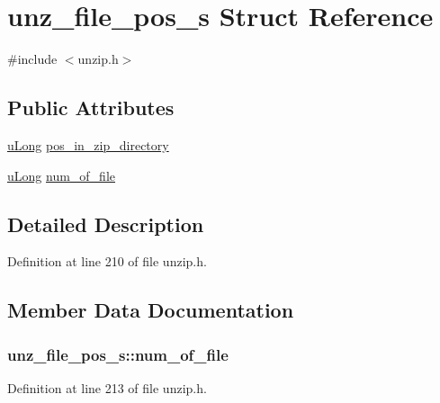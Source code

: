 \hypertarget{structunz__file__pos__s}{\section{unz\-\_\-file\-\_\-pos\-\_\-s Struct Reference}
\label{structunz__file__pos__s}
}


{\ttfamily \#include $<$unzip.\-h$>$}

\subsection*{Public Attributes}
\begin{DoxyCompactItemize}
\item 
\hyperlink{zconf_8h_a154b3b80120c903a368fec5f11f3007a}{u\-Long} \hyperlink{structunz__file__pos__s_a87d193346d3825363f899f574a2f3cb2}{pos\-\_\-in\-\_\-zip\-\_\-directory}
\item 
\hyperlink{zconf_8h_a154b3b80120c903a368fec5f11f3007a}{u\-Long} \hyperlink{structunz__file__pos__s_a771dc0b7dba811b6174382f87f6800fc}{num\-\_\-of\-\_\-file}
\end{DoxyCompactItemize}


\subsection{Detailed Description}


Definition at line 210 of file unzip.\-h.



\subsection{Member Data Documentation}
\hypertarget{structunz__file__pos__s_a771dc0b7dba811b6174382f87f6800fc}{
\subsubsection[{num\-\_\-of\-\_\-file}]{ unz\-\_\-file\-\_\-pos\-\_\-s\-::num\-\_\-of\-\_\-file}}\label{structunz__file__pos__s_a771dc0b7dba811b6174382f87f6800fc}


Definition at line 213 of file unzip.\-h.

